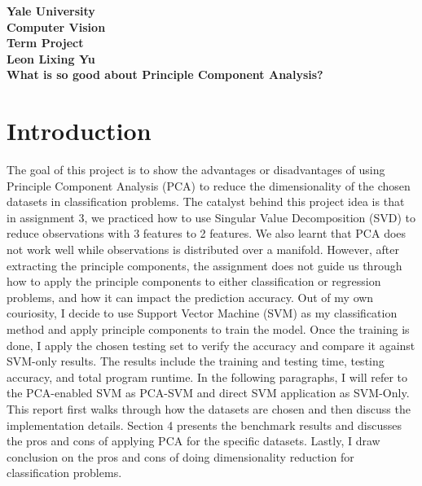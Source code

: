 \documentclass[11pt]{article}
\begin{document}

\pagestyle{empty}


\vspace{-.5in}

\large
\begin{center}
{\bf Yale University \\ Computer Vision\vspace{.2in} \\
Term Project}\large\vspace{.3in} \\
{\bf Leon Lixing Yu}\vspace{.3in}\\ 

{\Large \bf What is so good about Principle Component Analysis?}
\vspace{.3in}\\ 

\end{center}

\vspace{.25in}

\section{Introduction}


\par
The goal of this project is to show the advantages or disadvantages of using Principle Component Analysis (PCA) to reduce the dimensionality of the chosen datasets in classification problems. The catalyst behind this project idea is that in assignment 3, we practiced how to use Singular Value Decomposition (SVD) to reduce observations with 3 features to 2 features. We also learnt that PCA does not work well while observations is distributed over a manifold. However, after extracting the principle components, the assignment does not guide us through how to apply the principle components to either classification or regression problems, and how it can impact the prediction accuracy. Out of my own couriosity, I decide to use Support Vector Machine (SVM) as my classification method and apply principle components to train the model. Once the training is done, I apply the chosen testing set to verify the accuracy and compare it against SVM-only results. The results include the training and testing time, testing accuracy, and total program runtime. In the following paragraphs, I will refer to the PCA-enabled SVM as PCA-SVM and direct SVM application as SVM-Only. This report first walks through how the datasets are chosen and then discuss the implementation details. Section 4 presents the benchmark results and discusses the pros and cons of applying PCA for the specific datasets. 
Lastly, I draw conclusion on the pros and cons of doing dimensionality reduction for classification problems. 
\end{document}
